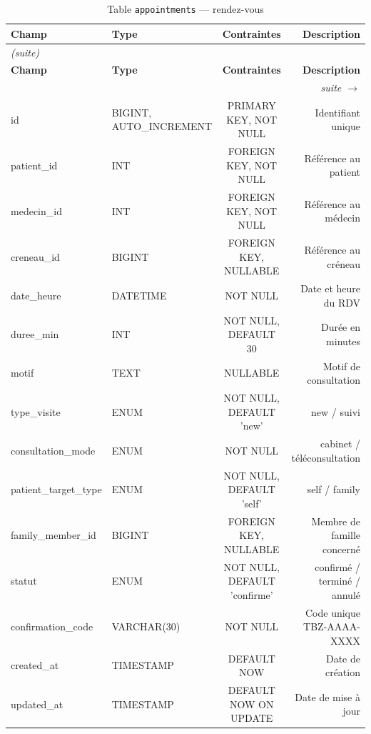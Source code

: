 \documentclass[12pt,a4paper]{report}
\newcommand{\longtblheader}{%
  \hline
  \textbf{Champ} & \textbf{Type} & \textbf{Contraintes} & \textbf{Description} \\
  \hline\hline
  \endfirsthead
  \multicolumn{4}{l}{\small\textit{(suite)}} \\
  \hline
  \textbf{Champ} & \textbf{Type} & \textbf{Contraintes} & \textbf{Description} \\
  \hline\hline
  \endhead
  \hline
  \multicolumn{4}{r|}{\small\textit{suite $\rightarrow$}} \\
  \endfoot
  \hline
  \endlastfoot
}
\begin{document}
\begin{longtable}{ABCD}
  \caption{Table \texttt{appointments} --- rendez-vous} \label{tab:appointments} \\
  \longtblheader
  id                    & BIGINT, AUTO\_INCREMENT & PRIMARY KEY, NOT NULL        & Identifiant unique \\ \hline
  patient\_id           & INT                     & FOREIGN KEY, NOT NULL        & R\'ef\'erence au patient \\ \hline
  medecin\_id           & INT                     & FOREIGN KEY, NOT NULL        & R\'ef\'erence au m\'edecin \\ \hline
  creneau\_id           & BIGINT                  & FOREIGN KEY, NULLABLE        & R\'ef\'erence au cr\'eneau \\ \hline
  date\_heure           & DATETIME                & NOT NULL                     & Date et heure du RDV \\ \hline
  duree\_min            & INT                     & NOT NULL, DEFAULT 30         & Dur\'ee en minutes \\ \hline
  motif                 & TEXT                    & NULLABLE                     & Motif de consultation \\ \hline
  type\_visite          & ENUM                    & NOT NULL, DEFAULT 'new'      & new / suivi \\ \hline
  consultation\_mode    & ENUM                    & NOT NULL                     & cabinet / t\'el\'econsultation \\ \hline
  patient\_target\_type & ENUM                    & NOT NULL, DEFAULT 'self'     & self / family \\ \hline
  family\_member\_id    & BIGINT                  & FOREIGN KEY, NULLABLE        & Membre de famille concern\'e \\ \hline
  statut                & ENUM                    & NOT NULL, DEFAULT 'confirme' & confirm\'e / termin\'e / annul\'e \\ \hline
  confirmation\_code    & VARCHAR(30)             & NOT NULL                     & Code unique TBZ-AAAA-XXXX \\ \hline
  created\_at           & TIMESTAMP               & DEFAULT NOW                  & Date de cr\'eation \\ \hline
  updated\_at           & TIMESTAMP               & DEFAULT NOW ON UPDATE        & Date de mise \`a jour \\ \hline
\end{longtable}
\end{document}
